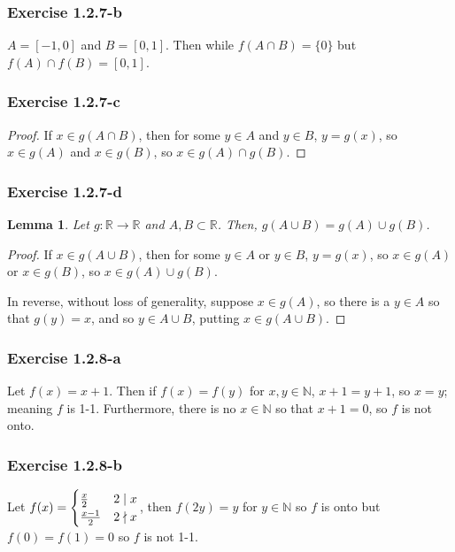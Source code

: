 \documentclass{article}
\newcommand{\R}{\mathbb{R}}
\newcommand{\N}{\mathbb{N}}
\newtheorem*{lemma}{Lemma}
\begin{document}
\subsubsection*{Exercise 1.2.7-b}

$A = [-1, 0]$ and $B = [0, 1]$. Then while $f(A \cap B) = \{0\}$ but $f(A) \cap f(B) = [0, 1]$.

\subsubsection*{Exercise 1.2.7-c}

\begin{proof}
If $x \in g(A \cap B)$, then for some $y \in A$ and $y \in B$, $y = g(x)$, so $x \in g(A)$ and $x \in g(B)$, so $x \in g(A) \cap g(B)$.
\end{proof}

\subsubsection*{Exercise 1.2.7-d}

\begin{lemma}
Let $g: \R \to \R$ and $A, B \subset \R$. Then, $g(A \cup B) = g(A) \cup g(B)$.
\end{lemma}

\begin{proof}
If $x \in g(A \cup B)$, then for some $y \in A$ or $y \in B$, $y = g(x)$, so $x \in g(A)$ or $x \in g(B)$, so $x \in g(A) \cup g(B)$.

In reverse, without loss of generality, suppose $x \in g(A)$, so there is a $y \in A$ so that $g(y) = x$, and so $y \in A \cup B$, putting $x \in g(A \cup B)$.
\end{proof}

\subsubsection*{Exercise 1.2.8-a}

Let $f(x) = x + 1$. Then if $f(x) = f(y)$ for $x, y \in \N$, $x + 1 = y + 1$, so $x = y$; meaning $f$ is 1-1.
Furthermore, there is no $x \in \N$ so that $x + 1 = 0$, so $f$ is not onto.

\subsubsection*{Exercise 1.2.8-b}

Let $f(x) = \begin{cases} {x \over 2} & 2 \mid x \\ {x - 1 \over 2} & 2 \nmid x\end{cases}$, then $f(2y) = y$ for $y \in \N$ so $f$ is onto but $f(0) = f(1) = 0$ so $f$ is not 1-1.
\end{document}
